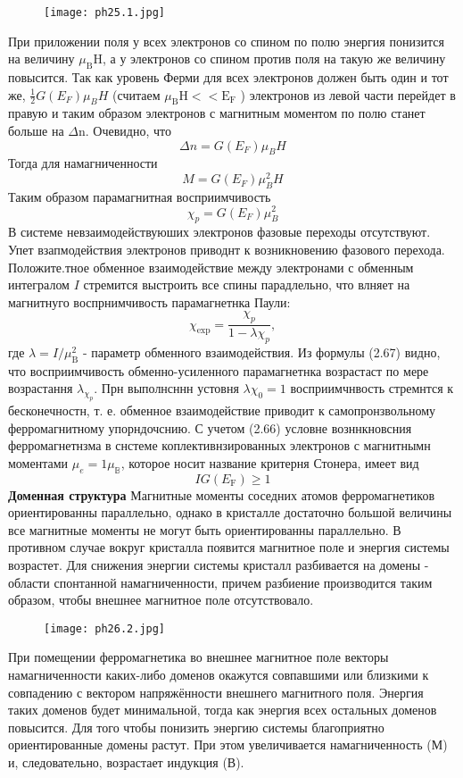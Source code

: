 \begin{figure}[h!]
    \centering
    \texttt{[image: ph25.1.jpg]}
\end{figure}
 При приложении поля у всех электронов со спином по полю энергия понизится на величину $\mu_{\mathrm{B}} \mathrm{H}$, а у электронов со спином против поля на такую же величину повысится. Так как уровень Ферми для всех электронов должен быть один и тот же, $ \frac{1}{2} G(E_F) \mu_{B} H$ 
(считаем $\mu_{\mathrm{B}} \mathrm{H}<<\mathrm{E}_{\mathrm{F}}$ ) электронов из левой части перейдет в правую  и таким образом электронов с магнитным моментом по полю станет больше на $\Delta \mathrm{n}$. Очевидно, что
$$
\Delta n=G\left(E_F\right) \mu_B H
$$
Тогда для намагниченности
$$
M=G\left(E_F\right) \mu_B^2 H
$$
Таким образом парамагнитная восприимчивость
$$
\chi_p=G\left(E_F\right) \mu_B^2
$$
В системе невзаимодействуюших электронов фазовые переходы отсутствуют. Упет взапмодействия электронов приводнт к возникновению фазового перехода. Положите.тное обменное взаимодействие между электронами с обменным интегралом $I$ стремится выстроить все спины парадлельно, что влняет на магнитнуго воспрнимчивость парамагнетнка Паули:
$$
\chi_{\mathrm{exp}}=\frac{\chi_p}{1-\lambda \chi_p},
$$
где $\lambda=I / \mu_{\mathrm{B}}^2$ - параметр обменного взаимодействия. Из формулы (2.67) видно, что восприимчивость обменно-усиленного парамагнетнка возрастаст по мере возрастання $\lambda_{\chi_p}$. Прн выполнсннн устовня $\lambda \chi_0=1$ восприимчнвость стремнтся к бесконечностн, т. е. обменное взаимодействие приводит к самопронзвольному ферромагнитному упорндочснию. С учетом (2.66) условне возннкновсния ферромагнетнзма в снстеме коплективнзированных электронов с магнитнымн моментами $\mu_e=1 \mu_{\mathbb{B}}$, которое носит название критерня Стонера, имеет вид
$$
I G\left(E_{\mathrm{F}}\right) \geq 1
$$
\textbf{Доменная структура}
Магнитные моменты соседних атомов ферромагнетиков ориентированны параллельно,
однако в кристалле достаточно большой величины все магнитные моменты не могут быть
ориентированны параллельно. В противном случае вокруг кристалла появится магнитное
поле и энергия системы возрастет. Для снижения энергии системы кристалл разбивается на
домены - области спонтанной намагниченности, причем разбиение производится таким
образом, чтобы внешнее магнитное поле отсутствовало.
\begin{figure}[h!]
    \centering
    \texttt{[image: ph26.2.jpg]}
\end{figure}
При помещении ферромагнетика во внешнее магнитное поле векторы намагниченности
каких-либо доменов окажутся совпавшими или близкими к совпадению с вектором
напряжённости внешнего магнитного поля. Энергия таких доменов будет минимальной,
тогда как энергия всех остальных доменов повысится. Для того чтобы понизить энергию
системы благоприятно ориентированные домены растут. При этом увеличивается
намагниченность (М) и, следовательно, возрастает индукция (В).



